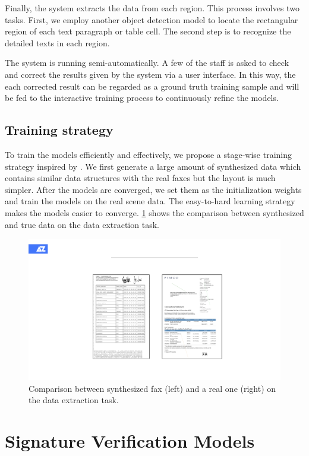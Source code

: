 \documentclass[sigconf]{acmart}
\begin{document}
Finally, the system extracts the data from each region. This process involves two tasks. First, we employ another object detection model to locate the rectangular region of each text paragraph or table cell. The second step is to recognize the detailed texts in each region.

The system is running semi-automatically. A few of the staff is asked to check and correct the results given by the system via a user interface. In this way, the each corrected result can be regarded as a ground truth training sample and will be fed to the interactive training process to continuously refine the models.

\subsection{Training strategy}
To train the models efficiently and effectively, we propose a stage-wise training strategy inspired by \cite{bengio2009curriculum}. We first generate a large amount of synthesized data which contains similar data structures with the real faxes but the layout is much simpler. After the models are converged, we set them as the initialization weights and train the models on the real scene data. The easy-to-hard learning strategy makes the models easier to converge. \ref{figure4} shows the comparison between synthesized and true data on the data extraction task.

\begin{figure}[h]
	\centering
	\includegraphics[width=\linewidth]{figure4}
	\caption{Comparison between synthesized fax (left) and a real one (right) on the data extraction task. }
	\label{figure4}
\end{figure}



\section{Signature Verification Models}
\end{document}
